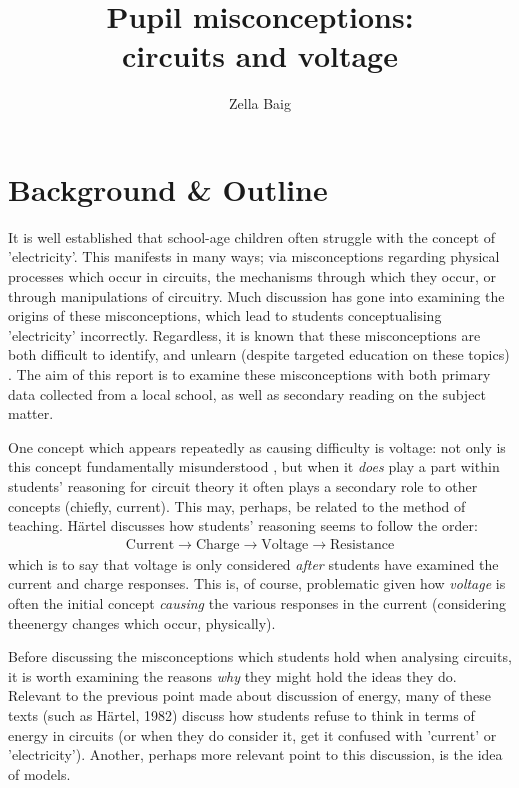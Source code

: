 \documentclass[a4paper,openany,nobib]{tufte-book}
\title{Pupil misconceptions:\\ \noindent circuits and voltage}
\author{Zella Baig}
\begin{document}
\frontmatter
{\maketitle}
\tableofcontents
\thispagestyle{empty}
\mainmatter
\chapter{Background \& Outline}
\setcounter{page}{1}
It is well established that school-age children often struggle with the concept of {'electricity'\autocite{psillos}}.
This manifests in many ways;
via misconceptions regarding physical processes which occur in circuits, the mechanisms through which they occur, or through manipulations of circuitry. Much discussion has gone into examining the origins of these misconceptions,
which lead to students conceptualising 'electricity' incorrectly.
Regardless, it is known that these misconceptions are both difficult to identify, and unlearn (despite targeted education on these {topics)
\autocite{lee2001}}.
The aim of this report is to examine these misconceptions with both primary data collected from a local school, as well as secondary reading on the subject matter.

One concept which appears repeatedly as causing difficulty is voltage: not only is this concept fundamentally {misunderstood \autocite{shipstone_children}}, but when it \emph{does} play a part within students' reasoning for circuit theory it often plays a secondary role to other concepts (chiefly, current).
This may, perhaps, be related to the method of teaching. 
Härtel discusses how students' reasoning seems to follow the {order\autocite{hartel82}}:
\begin{align*}
	\text{Current}\rightarrow \text{Charge} \rightarrow \text{Voltage} \rightarrow \text{Resistance}
\end{align*}
which is to say that voltage is only considered \emph{after} students have examined the current and charge responses. This is, of course, problematic given how \emph{voltage} is often the initial concept \emph{causing} the various responses in the current (considering theenergy changes which occur, physically).

Before discussing the misconceptions which students hold when analysing circuits, it is worth examining the reasons \emph{why} they might hold the ideas they do.
Relevant to the previous point made about discussion of energy, many of these texts (such as Härtel, 1982) discuss how students refuse to think in terms of energy in circuits (or when they do consider it, get it confused with 'current' or 'electricity').
Another, perhaps more relevant point to this discussion, is the idea of models.
\end{document}
